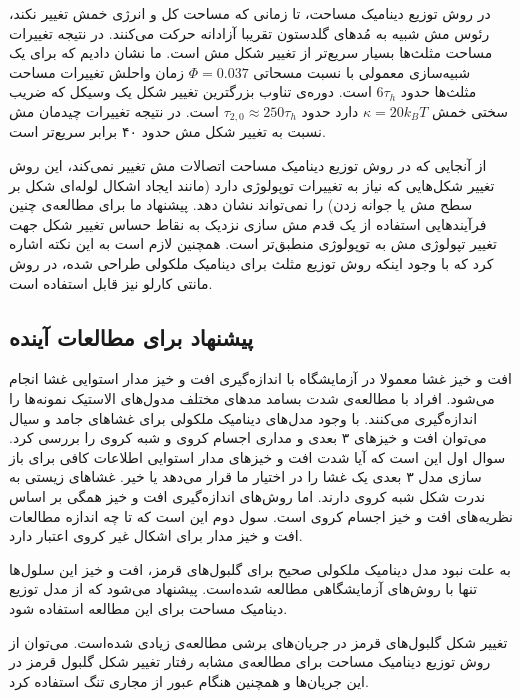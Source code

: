 در روش توزیع دینامیک مساحت، تا زمانی که مساحت کل و انرژی خمش تغییر نکند، رئوس مش شبیه به مُدهای گلدستون تقریبا آزادانه حرکت می‌کنند. در نتیجه تغییرات مساحت مثلث‌ها بسیار سریع‌تر از تغییر شکل مش است. ما نشان دادیم که برای یک شبیه‌سازی معمولی با نسبت مسحاتی
$\Phi=0.037$
زمان واحلش تغییرات مساحت مثلث‌ها حدود 
$6\tau_h$
است. دوره‌ی تناوب بزرگترین تغییر شکل یک وسیکل که ضریب سختی خمش
$\kappa=20k_BT$
دارد حدود 
$\tau_{2,0}\approx250\tau_h$
است. در نتیجه تغییرات چیدمان مش نسبت به تغییر شکل مش حدود ۴۰ برابر سریع‌تر است. 

از آنجایی که در روش توزیع دینامیک مساحت اتصالات مش تغییر نمی‌کند،‌ این روش تغییر شکل‌هایی که نیاز به تغییرات توپولوژی دارد (مانند ایجاد اشکال لوله‌ای شکل بر سطح مش یا جوانه زدن)  را نمی‌تواند نشان دهد. پیشنهاد ما برای مطالعه‌ی چنین فرآیندهایی استفاده از یک قدم مش سازی نزدیک به نقاط حساس تغییر شکل جهت تغییر تپولوژی مش به توپولوژی منطبق‌تر است. همچنین لازم است به این نکته اشاره کرد که با وجود اینکه روش توزیع مثلث برای دینامیک ملکولی طراحی شده، در روش مانتی کارلو نیز قابل استفاده است.

\subsection{
پیشنهاد برای مطالعات آینده
}

افت و خیز غشا معمولا در آزمایشگاه با اندازه‌گیری افت و خیز مدار استوایی غشا انجام می‌شود. افراد با مطالعه‌ی شدت‌ بسامد مد‌های مختلف مدول‌های الاستیک نمونه‌ها  را اندازه‌گیری می‌کنند. با وجود مدل‌های دینامیک ملکولی برای غشاها‌ی جامد و سیال می‌توان افت‌ و خیز‌های ۳ بعدی و مداری اجسام کروی و شبه کروی را بررسی کرد. سوال اول این است که آیا شدت افت و خیز‌های مدار استوایی اطلاعات کافی برای باز سازی مدل ۳ بعدی یک غشا را در اختیار ما قرار می‌دهد یا خیر. غشا‌های زیستی به ندرت شکل شبه کروی دارند. اما روش‌های اندازه‌گیری افت و خیز همگی بر اساس نظریه‌های افت و خیز اجسام کروی است. سول دوم این است که تا چه اندازه مطالعات افت و خیز مدار برای اشکال غیر کروی اعتبار دارد.

به علت نبود مدل دینامیک ملکولی صحیح برای گلبول‌های قرمز، افت و خیز این سلول‌ها تنها با روش‌های آزمایشگاهی مطالعه شده‌است. پیشنهاد می‌شود که از مدل توزیع دینامیک مساحت برای این مطالعه استفاده شود. 

تغییر شکل گلبول‌های قرمز در جریان‌های برشی مطالعه‌ی زیادی شده‌است. می‌توان از روش توزیع دینامیک مساحت برای مطالعه‌ی مشابه رفتار تغییر شکل گلبول قرمز در این جریان‌ها و همچنین هنگام عبور از مجاری تنگ استفاده کرد. 








